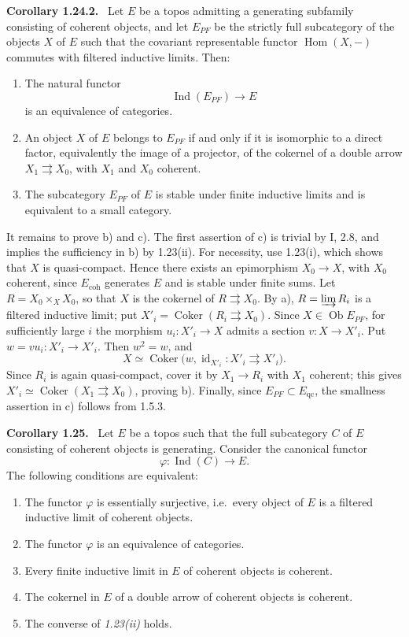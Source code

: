\documentclass[11pt]{article}
\newcommand{\Hom}{\operatorname{Hom}}
\newcommand{\Ob}{\operatorname{Ob}}
\newcommand{\id}{\operatorname{id}}
\newcommand{\Coker}{\operatorname{Coker}}
\newcommand{\Ind}{\operatorname{Ind}}
\newcommand{\qc}{\mathrm{qc}}
\newcommand{\coh}{\mathrm{coh}}
\newcommand{\ie}{i.e.\ }
\newenvironment{statement}[1]{\par\medskip\noindent\textbf{#1.}\ }{\par\medskip}
\begin{document}
\begin{statement}{Corollary 1.24.2}
Let \(E\) be a topos admitting a generating subfamily consisting of coherent objects, and let \(E_{PF}\) be the strictly full subcategory of the objects \(X\) of \(E\) such that the covariant representable functor \(\Hom(X,-)\) commutes with filtered inductive limits. Then:
\begin{enumerate}[label=\alph*)]
\item The natural functor
\[
\Ind(E_{PF})\longrightarrow E
\]
is an equivalence of categories.
\item An object \(X\) of \(E\) belongs to \(E_{PF}\) if and only if it is isomorphic to a direct factor, equivalently the image of a projector, of the cokernel of a double arrow \(X_1\rightrightarrows X_0\), with \(X_1\) and \(X_0\) coherent.
\item The subcategory \(E_{PF}\) of \(E\) is stable under finite inductive limits and is equivalent to a small category.
\end{enumerate}
\end{statement}

It remains to prove b) and c). The first assertion of c) is trivial by I, 2.8, and implies the sufficiency in b) by 1.23(ii). For necessity, use 1.23(i), which shows that \(X\) is quasi-compact. Hence there exists an epimorphism \(X_0\to X\), with \(X_0\) coherent, since \(E_{\coh}\) generates \(E\) and is stable under finite sums. Let \(R=X_0\times_X X_0\), so that \(X\) is the cokernel of \(R\rightrightarrows X_0\). By a), \(R=\varinjlim R_i\) is a filtered inductive limit; put \(X'_i=\Coker(R_i\rightrightarrows X_0)\). Since \(X\in\Ob E_{PF}\), for sufficiently large \(i\) the morphism \(u_i:X'_i\to X\) admits a section \(v:X\to X'_i\). Put \(w=vu_i:X'_i\to X'_i\). Then \(w^2=w\), and
\[
X\simeq\Coker\bigl(w,\id_{X'_i}:X'_i\rightrightarrows X'_i\bigr).
\]
Since \(R_i\) is again quasi-compact, cover it by \(X_1\to R_i\) with \(X_1\) coherent; this gives \(X'_i\simeq\Coker(X_1\rightrightarrows X_0)\), proving b). Finally, since \(E_{PF}\subset E_{\qc}\), the smallness assertion in c) follows from 1.5.3.

\begin{statement}{Corollary 1.25}
Let \(E\) be a topos such that the full subcategory \(C\) of \(E\) consisting of coherent objects is generating. Consider the canonical functor
\[
\varphi:\Ind(C)\longrightarrow E.
\]
The following conditions are equivalent:
\begin{enumerate}[label=(\roman*)]
\item The functor \(\varphi\) is essentially surjective, \ie every object of \(E\) is a filtered inductive limit of coherent objects.
\item[(i bis)] The functor \(\varphi\) is an equivalence of categories.
\item Every finite inductive limit in \(E\) of coherent objects is coherent.
\item[(ii bis)] The cokernel in \(E\) of a double arrow of coherent objects is coherent.
\item[(iii)] The converse of \emph{1.23(ii)} holds.
\end{enumerate}
\end{statement}
\end{document}
